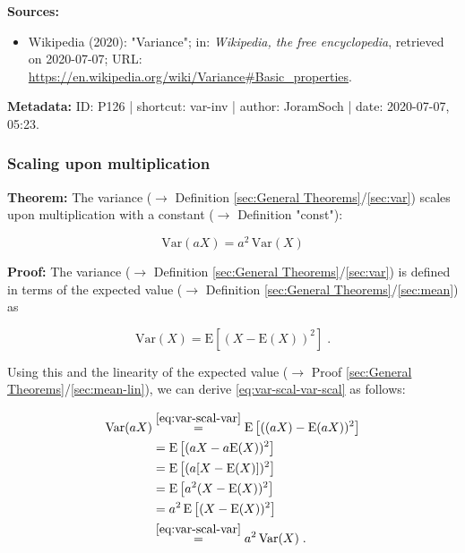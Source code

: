 \documentclass[a4paper,12pt,twoside]{book}
\begin{document}
\vspace{1em}
\textbf{Sources:}
\begin{itemize}
\item Wikipedia (2020): "Variance"; in: \textit{Wikipedia, the free encyclopedia}, retrieved on 2020-07-07; URL: \url{https://en.wikipedia.org/wiki/Variance#Basic_properties}.
\end{itemize}


\vspace{1em}
\textbf{Metadata:} ID: P126 | shortcut: var-inv | author: JoramSoch | date: 2020-07-07, 05:23.
\vspace{1em}



\subsubsection[\textbf{Scaling upon multiplication}]{Scaling upon multiplication} \label{sec:var-scal}
\setcounter{equation}{0}

\textbf{Theorem:} The variance ($\rightarrow$ Definition \ref{sec:General Theorems}/\ref{sec:var}) scales upon multiplication with a constant ($\rightarrow$ Definition "const"):

\begin{equation} \label{eq:var-scal-var-scal}
\mathrm{Var}(aX) = a^2 \, \mathrm{Var}(X)
\end{equation}


\vspace{1em}
\textbf{Proof:} The variance ($\rightarrow$ Definition \ref{sec:General Theorems}/\ref{sec:var}) is defined in terms of the expected value ($\rightarrow$ Definition \ref{sec:General Theorems}/\ref{sec:mean}) as

\begin{equation} \label{eq:var-scal-var}
\mathrm{Var}(X) = \mathrm{E}\left[ (X-\mathrm{E}(X))^2 \right] \; .
\end{equation}

Using this and the linearity of the expected value ($\rightarrow$ Proof \ref{sec:General Theorems}/\ref{sec:mean-lin}), we can derive \eqref{eq:var-scal-var-scal} as follows:

\begin{equation} \label{eq:var-scal-var-scal-qed}
\begin{split}
\mathrm{Var}(aX) &\overset{\eqref{eq:var-scal-var}}{=} \mathrm{E}\left[ ((aX)-\mathrm{E}(aX))^2 \right] \\
&= \mathrm{E}\left[ (aX - a\mathrm{E}(X))^2 \right] \\
&= \mathrm{E}\left[ (a [X - \mathrm{E}(X)])^2 \right] \\
&= \mathrm{E}\left[ a^2 (X - \mathrm{E}(X))^2 \right] \\
&= a^2 \, \mathrm{E}\left[ (X - \mathrm{E}(X))^2 \right] \\
&\overset{\eqref{eq:var-scal-var}}{=} a^2 \, \mathrm{Var}(X) \; . \\
\end{split}
\end{equation}
\end{document}
